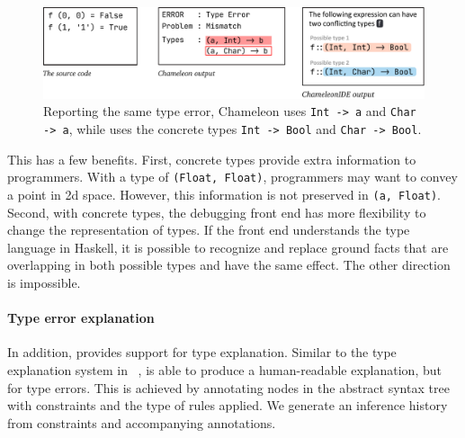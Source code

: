 \begin{figure}
    \centering
    \includegraphics[width=\linewidth, trim=0mm 6mm 0mm 0mm]{images/compare-to-original.pdf}
    \caption{
Reporting the same type error, Chameleon uses
\texttt{Int -> a} and \texttt{Char -> a}, while \chameleon{} uses the 
concrete types \texttt{Int -> Bool} and \texttt{Char -> Bool}.
    }
    \label{fig:compare-to-original}
\end{figure}

This has a few benefits. First, concrete types provide extra information to programmers. With a type of \texttt{(Float, Float)}, programmers may want to convey a point in 2d space. However, this information is not preserved in \texttt{(a, Float)}. Second, with concrete types, the debugging front end has more flexibility to change the representation of types. If the front end
understands the type language in Haskell, it is possible to recognize and replace ground facts that are overlapping in both possible types and have the same effect. The other direction is impossible. 

\paragraph{Type error explanation}

In addition, \chameleon{} provides support for type explanation. Similar to the type explanation system  in ~\cite{jun_explaining_2002},  \chameleon{} is able to produce a human-readable explanation, but for type errors. This is achieved by annotating nodes in the abstract syntax tree with constraints and the type of rules applied. We generate an inference history from constraints and accompanying annotations. 



